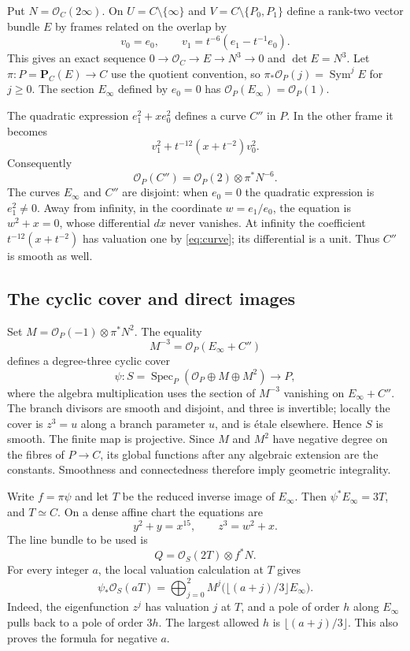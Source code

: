 \documentclass[11pt]{article}
\theoremstyle{remark}\newtheorem{remark}[theorem]{Remark}
\newcommand{\OO}{\mathcal O}
\newcommand{\Spec}{\operatorname{Spec}}
\newcommand{\Sym}{\operatorname{Sym}}
\newcommand{\PP}{\mathbf P}
\begin{document}
Put $N=\OO_C(2\infty)$. On $U=C\setminus\{\infty\}$ and $V=C\setminus\{P_0,P_1\}$ define a rank-two vector bundle $E$ by frames related on the overlap by
\[
 v_0=e_0,\qquad v_1=t^{-6}(e_1-t^{-1}e_0).
\]
This gives an exact sequence $0\to\OO_C\to E\to N^3\to0$ and $\det E=N^3$. Let $\pi:P=\PP_C(E)\to C$ use the quotient convention, so $\pi_*\OO_P(j)=\Sym^jE$ for $j\geq0$. The section $E_\infty$ defined by $e_0=0$ has $\OO_P(E_\infty)=\OO_P(1)$.

The quadratic expression $e_1^2+xe_0^2$ defines a curve $C''$ in $P$. In the other frame it becomes
\[
 v_1^2+t^{-12}(x+t^{-2})v_0^2.
\]
Consequently
\[
 \OO_P(C'')=\OO_P(2)\otimes\pi^*N^{-6}.
\]
The curves $E_\infty$ and $C''$ are disjoint: when $e_0=0$ the quadratic expression is $e_1^2\ne0$. Away from infinity, in the coordinate $w=e_1/e_0$, the equation is $w^2+x=0$, whose differential $dx$ never vanishes. At infinity the coefficient $t^{-12}(x+t^{-2})$ has valuation one by \eqref{eq:curve}; its differential is a unit. Thus $C''$ is smooth as well.

\subsection{The cyclic cover and direct images}

Set $M=\OO_P(-1)\otimes\pi^*N^2$. The equality
\[
 M^{-3}=\OO_P(E_\infty+C'')
\]
defines a degree-three cyclic cover
\[
 \psi:S=\Spec_P(\OO_P\oplus M\oplus M^2)\longrightarrow P,
\]
where the algebra multiplication uses the section of $M^{-3}$ vanishing on $E_\infty+C''$. The branch divisors are smooth and disjoint, and three is invertible; locally the cover is $z^3=u$ along a branch parameter $u$, and is \'etale elsewhere. Hence $S$ is smooth. The finite map is projective. Since $M$ and $M^2$ have negative degree on the fibres of $P\to C$, its global functions after any algebraic extension are the constants. Smoothness and connectedness therefore imply geometric integrality.

Write $f=\pi\psi$ and let $T$ be the reduced inverse image of $E_\infty$. Then $\psi^*E_\infty=3T$, and $T\simeq C$. On a dense affine chart the equations are
\[
 y^2+y=x^{15},\qquad z^3=w^2+x.
\]
The line bundle to be used is
\[
 Q=\OO_S(2T)\otimes f^*N.
\]
For every integer $a$, the local valuation calculation at $T$ gives
\begin{equation}\label{eq:floor}
 \psi_*\OO_S(aT)
 =\bigoplus_{j=0}^2M^j\bigl(\lfloor(a+j)/3\rfloor E_\infty\bigr).
\end{equation}
Indeed, the eigenfunction $z^j$ has valuation $j$ at $T$, and a pole of order $h$ along $E_\infty$ pulls back to a pole of order $3h$. The largest allowed $h$ is $\lfloor(a+j)/3\rfloor$. This also proves the formula for negative $a$.
\end{document}
